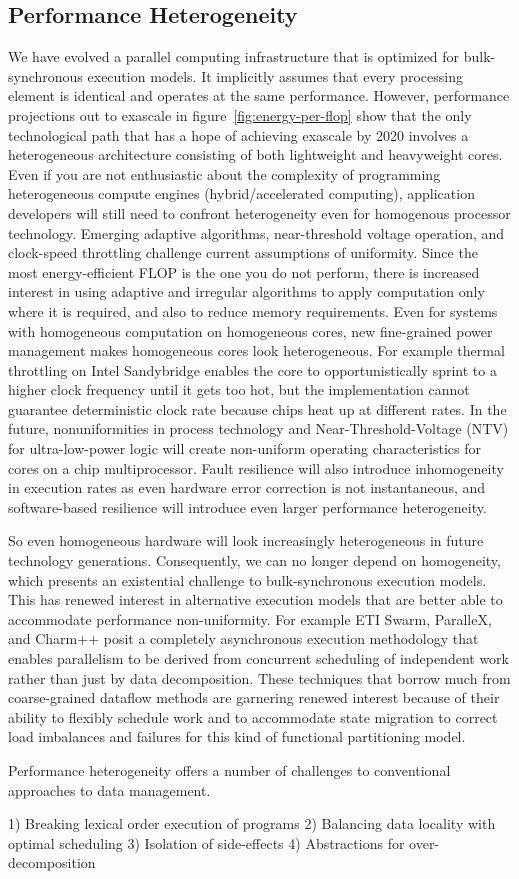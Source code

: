 \subsection{Performance Heterogeneity}

We have evolved a parallel computing infrastructure that is optimized for bulk-synchronous execution models.  It implicitly assumes that every processing element is identical and operates at the same performance.  However, performance projections out to exascale in figure~\ref{fig:energy-per-flop} show that the only technological path that has a hope of achieving exascale by 2020 involves a heterogeneous architecture consisting of both lightweight and heavyweight cores.  Even if you are not enthusiastic about the complexity of programming heterogeneous compute engines (hybrid/accelerated computing), application developers will still need to confront heterogeneity even for homogenous processor technology.
Emerging adaptive algorithms, near-threshold voltage operation, and clock-speed throttling challenge current assumptions of uniformity.
Since the most energy-efficient FLOP is the one you do not perform, there is increased interest in using adaptive and irregular algorithms to apply computation only where it is required, and also to reduce memory requirements.  Even for systems with homogeneous computation on homogeneous cores, new fine-grained power management makes homogeneous cores look heterogeneous.  For example thermal throttling on Intel Sandybridge enables the core to opportunistically sprint to a higher clock frequency until it gets too hot, but the implementation cannot guarantee deterministic clock rate because chips heat up at different rates.  In the future, nonuniformities in process technology and Near-Threshold-Voltage (NTV) for ultra-low-power logic will create non-uniform operating characteristics for cores on a chip multiprocessor.  Fault resilience will also introduce inhomogeneity in execution rates as even hardware error correction is not instantaneous, and software-based resilience will introduce even larger performance heterogeneity.

So even homogeneous hardware will look increasingly heterogeneous in future technology generations.  Consequently, we can no longer depend on homogeneity, which presents an existential challenge to bulk-synchronous execution models.  This has renewed interest in alternative execution models that are better able to accommodate performance non-uniformity.  For example ETI Swarm, ParalleX, and Charm++ posit a completely asynchronous execution methodology that enables parallelism to be derived from concurrent scheduling of independent work rather than just by data decomposition.  These techniques that borrow much from coarse-grained dataflow methods are garnering renewed interest because of their ability to flexibly schedule work and to accommodate state migration to correct load imbalances and failures for this kind of functional partitioning model.



Performance heterogeneity offers a number of challenges to conventional approaches to data management.

1) Breaking lexical order execution of programs
2) Balancing data locality with optimal scheduling
3) Isolation of side-effects
4) Abstractions for over-decomposition

